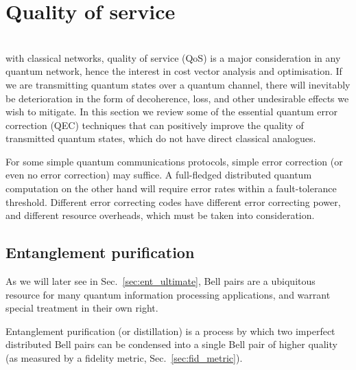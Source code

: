 %
%

\section{Quality of service}\label{sec:QOS_chap}

\\

 with classical networks, quality of service (QoS) is a major consideration in any quantum network, hence the interest in cost vector analysis and optimisation. If we are transmitting quantum states over a quantum channel, there will inevitably be deterioration in the form of decoherence, loss, and other undesirable effects we wish to mitigate. In this section we review some of the essential quantum error correction (QEC) techniques that can positively improve the quality of transmitted quantum states, which do not have direct classical analogues.

For some simple quantum communications protocols, simple error correction (or even no error correction) may suffice. A full-fledged distributed quantum computation on the other hand will require error rates within a fault-tolerance threshold. Different error correcting codes have different error correcting power, and different resource overheads, which must be taken into consideration.

%
%

\subsection{Entanglement purification}

As we will later see in Sec.~\ref{sec:ent_ultimate}, Bell pairs are a ubiquitous resource for many quantum information processing applications, and warrant special treatment in their own right.

Entanglement purification (or distillation) is a process by which two imperfect distributed Bell pairs can be condensed into a single Bell pair of higher quality (as measured by a fidelity metric, Sec.~\ref{sec:fid_metric}).

